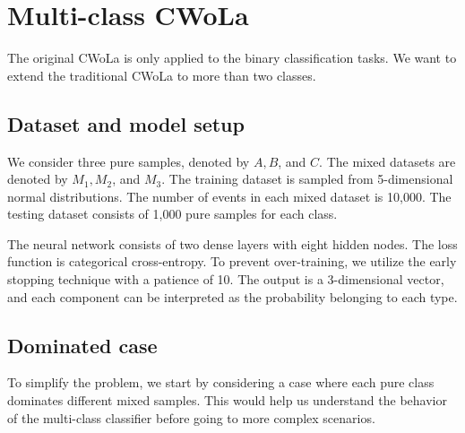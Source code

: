 \documentclass[12pt]{article}
\begin{document}
\section{Multi-class CWoLa}%
\label{sec:multi_class_cwola}
    The original CWoLa is only applied to the binary classification tasks. We want to extend the traditional CWoLa to more than two classes.

    \subsection{Dataset and model setup}%
    \label{sub:dataset_and_model_setup}
        We consider three pure samples, denoted by $A, B$, and $C$. The mixed datasets are denoted by $M_1, M_2$, and $M_3$. The training dataset is sampled from 5-dimensional normal distributions. The number of events in each mixed dataset is 10,000. The testing dataset consists of 1,000 pure samples for each class.

        The neural network consists of two dense layers with eight hidden nodes. The loss function is categorical cross-entropy. To prevent over-training, we utilize the early stopping technique with a patience of 10. The output is a 3-dimensional vector, and each component can be interpreted as the probability belonging to each type.
    \subsection{Dominated case}%
    \label{sub:dominated_case}
        To simplify the problem, we start by considering a case where each pure class dominates different mixed samples. This would help us understand the behavior of the multi-class classifier before going to more complex scenarios.
\end{document}
